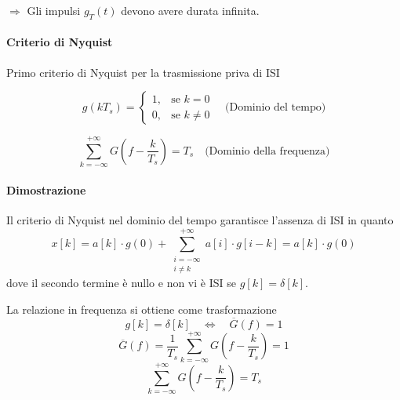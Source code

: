 \(\Rightarrow\) Gli impulsi \( g_T(t) \) devono avere durata infinita.

\paragraph*{Criterio di Nyquist}{Primo criterio di Nyquist per la trasmissione priva di ISI}

\[ g(kT_s) =
    \begin{cases}
        1, & \text{se } k=0      \\
        0, & \text{se } k \neq 0
    \end{cases}
    \quad \text{(Dominio del tempo)}
\]

\[ \sum_{k=-\infty}^{+\infty} G\left(f-\frac{k}{T_s}\right) = T_s \quad \text{(Dominio della frequenza)} \]




\paragraph*{Dimostrazione}
Il criterio di Nyquist nel dominio del tempo garantisce l'assenza di ISI in quanto
\[ x[k] = a[k] \cdot g(0) + \sum_{\substack{i=-\infty \\ i \neq k}}^{+\infty} a[i] \cdot g[i-k] = a[k] \cdot g(0) \]
dove il secondo termine è nullo e non vi è ISI se \( g[k] = \delta[k] \).

La relazione in frequenza si ottiene come trasformazione
\[ g[k] = \delta[k] \quad \Longleftrightarrow \quad \overline{G}(f) = 1 \]
\[ \overline{G}(f) = \frac{1}{T_s} \sum_{k=-\infty}^{+\infty} G\left(f - \frac{k}{T_s}\right) = 1 \]
\[ \sum_{k=-\infty}^{+\infty} G\left(f - \frac{k}{T_s}\right) = T_s \]

